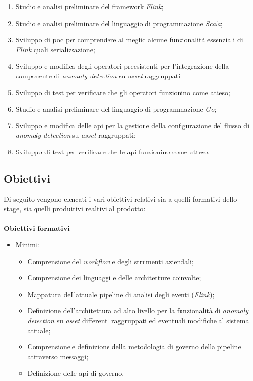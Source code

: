 \begin{enumerate}
	\item{Studio e analisi preliminare del \gls{framework} \textit{Flink};}
	\item{Studio e analisi preliminare del linguaggio di programmazione \textit{Scala};}
	\item{Sviluppo di \gls{poc} per comprendere al meglio alcune funzionalità essenziali di \textit{Flink} quali \gls{serializzazione};}
	\item{Sviluppo e modifica degli operatori preesistenti per l'integrazione della componente di \textit{anomaly detection} su \textit{asset} raggruppati;}
	\item{Sviluppo di test per verificare che gli operatori funzionino come atteso;}
	\item{Studio e analisi preliminare del linguaggio di programmazione \textit{Go};}
	\item{Sviluppo e modifica delle \gls{api} per la gestione della configurazione del flusso di \textit{anomaly detection} su \textit{asset} raggruppati;}
	\item{Sviluppo di test per verificare che le \gls{api} funzionino come atteso.}
\end{enumerate}

\subsection{Obiettivi}
Di seguito vengono elencati i vari obiettivi relativi sia a quelli formativi dello stage, sia quelli produttivi realtivi al prodotto:
\\ \\
\textbf{Obiettivi formativi}
\begin{itemize}
	\item{Minimi:
		\begin{itemize}
			\item{Comprensione del \textit{workflow} e degli strumenti aziendali;}
			\item{Comprensione dei linguaggi e delle architetture coinvolte;}
			\item{Mappatura dell’attuale \gls{pipeline} di analisi degli eventi (\textit{Flink});}
			\item{Definizione dell’architettura ad alto livello per la funzionalità di \textit{anomaly detection} su \textit{asset} differenti raggruppati ed eventuali modifiche al sistema attuale;}
			\item{Comprensione e definizione della metodologia di governo della \gls{pipeline} attraverso messaggi;}
			\item{Definizione delle \gls{api} di governo.}
		\end{itemize}			
	}
\end{itemize}

